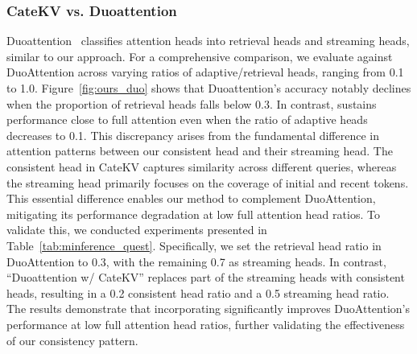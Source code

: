 


\subsubsection{CateKV vs. Duoattention}
Duoattention~\cite{duoattention} classifies attention heads into retrieval heads and streaming heads, similar to our approach. 
For a comprehensive comparison, we evaluate \shortname against DuoAttention across varying ratios of adaptive/retrieval heads, ranging from 0.1 to 1.0.
Figure~\ref{fig:ours_duo} shows that Duoattention's accuracy notably declines when the proportion of retrieval heads falls below 0.3. 
In contrast, \shortname sustains performance close to full attention even when the ratio of adaptive heads decreases to 0.1.
This discrepancy arises from the fundamental difference in attention patterns between our consistent head and their streaming head.
The consistent head in CateKV captures similarity across different queries, whereas the streaming head primarily focuses on the coverage of initial and recent tokens.
This essential difference enables our method to complement DuoAttention, mitigating its performance degradation at low full attention head ratios.
To validate this, we conducted experiments presented in Table~\ref{tab:minference_quest}. Specifically, we set the retrieval head ratio in DuoAttention to 0.3, with the remaining 0.7 as streaming heads.
In contrast, ``Duoattention w/ CateKV'' replaces part of the streaming heads with consistent heads, resulting in a 0.2 consistent head ratio and a 0.5 streaming head ratio.
The results demonstrate that incorporating \shortname significantly improves DuoAttention’s performance at low full attention head ratios, further validating the effectiveness of our consistency pattern.

